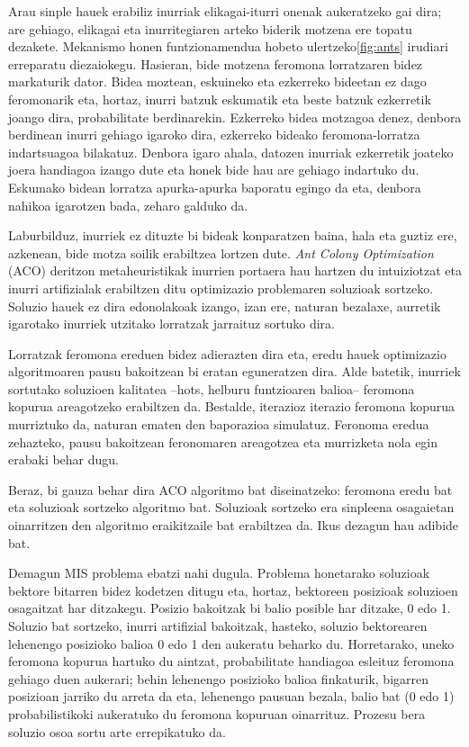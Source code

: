 \documentclass[eu]{ifirak}\usepackage[]{graphicx}\usepackage[]{color}
\newcommand{\eng}[1]{\textit{#1}}
\begin{document}
Arau sinple hauek erabiliz inurriak elikagai-iturri onenak aukeratzeko gai dira; are gehiago, elikagai eta inurritegiaren arteko biderik motzena ere topatu dezakete. Mekanismo honen funtzionamendua hobeto ulertzeko\ref{fig:ants} irudiari erreparatu diezaiokegu. Hasieran, bide motzena feromona lorratzaren bidez markaturik dator. Bidea moztean, eskuineko eta ezkerreko bideetan ez dago feromonarik eta, hortaz, inurri batzuk eskumatik eta beste batzuk ezkerretik joango dira, probabilitate berdinarekin. Ezkerreko bidea motzagoa denez, denbora berdinean inurri gehiago igaroko dira, ezkerreko bideako feromona-lorratza indartsuagoa bilakatuz. Denbora igaro ahala, datozen inurriak ezkerretik joateko joera handiagoa izango dute eta honek bide hau are gehiago indartuko du. Eskumako bidean lorratza apurka-apurka baporatu egingo da eta, denbora nahikoa igarotzen bada, zeharo galduko da. 

Laburbilduz, inurriek ez dituzte bi bideak konparatzen baina, hala eta guztiz ere, azkenean, bide motza soilik erabiltzea lortzen dute. \eng{Ant Colony Optimization} (ACO) deritzon metaheuristikak inurrien portaera hau hartzen du intuiziotzat eta inurri artifizialak erabiltzen ditu optimizazio problemaren soluzioak sortzeko. Soluzio hauek ez dira edonolakoak izango, izan ere, naturan bezalaxe, aurretik igarotako inurriek utzitako lorratzak jarraituz sortuko dira. 

Lorratzak feromona ereduen bidez adierazten dira eta, eredu hauek optimizazio algoritmoaren pausu bakoitzean bi eratan eguneratzen dira. Alde batetik, inurriek sortutako soluzioen kalitatea --hots, helburu funtzioaren balioa-- feromona kopurua areagotzeko erabiltzen da. Bestalde, iterazioz iterazio feromona kopurua murriztuko da, naturan ematen den baporazioa simulatuz. Feronoma eredua zehazteko, pausu bakoitzean feronomaren areagotzea eta murrizketa nola egin erabaki behar dugu.

Beraz, bi gauza behar dira ACO algoritmo bat diseinatzeko: feromona eredu bat eta soluzioak sortzeko algoritmo bat. Soluzioak sortzeko era sinpleena osagaietan oinarritzen den algoritmo eraikitzaile bat erabiltzea da. Ikus dezagun hau adibide bat.

Demagun MIS problema ebatzi nahi dugula. Problema honetarako soluzioak bektore bitarren bidez kodetzen ditugu eta, hortaz, bektoreen posizioak soluzioen osagaitzat har ditzakegu. Posizio bakoitzak bi balio posible har ditzake, 0 edo 1. Soluzio bat sortzeko, inurri artifizial bakoitzak, hasteko, soluzio bektorearen lehenengo posizioko balioa 0 edo 1 den aukeratu beharko du. Horretarako, uneko feromona kopurua hartuko du aintzat, probabilitate handiagoa esleituz feromona gehiago duen aukerari; behin lehenengo posizioko balioa finkaturik, bigarren posizioan jarriko du arreta da eta, lehenengo pausuan bezala, balio bat (0 edo 1) probabilistikoki aukeratuko du feromona kopuruan oinarrituz. Prozesu bera soluzio osoa sortu arte errepikatuko da.
\end{document}
